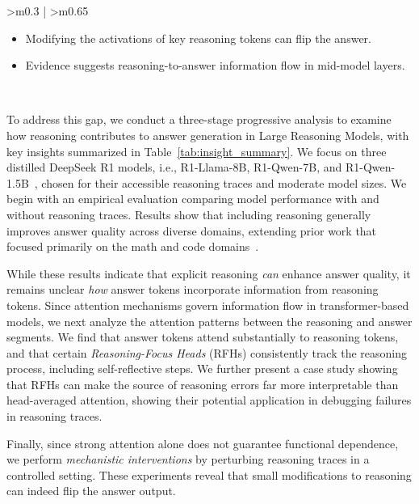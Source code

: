 \documentclass[11pt]{article}
\begin{document}
\begin{table}[ht]
\begin{tabular}{>{\centering\arraybackslash}m{0.3\textwidth} | >{\centering\arraybackslash}m{0.65\textwidth}}
    \begin{minipage}[c]{\linewidth}
      \begin{itemize}[leftmargin=*, itemsep=0pt, topsep=0pt, parsep=0pt, partopsep=0pt]
        \item Modifying the activations of key reasoning tokens can flip the answer.
        \item Evidence suggests reasoning-to-answer information flow in mid-model layers.
      \end{itemize}
    \end{minipage} \\
    \bottomrule
  \end{tabular}
  \caption{Summary of findings across empirical studies, attention analysis, and mechanistic interventions.}
  \label{tab:insight_summary}
\end{table}

To address this gap, we conduct a three-stage progressive analysis to examine how reasoning contributes to answer generation in Large Reasoning Models, with key insights summarized in Table~\ref{tab:insight_summary}. We focus on three distilled DeepSeek R1 models, i.e., R1-Llama-8B, R1-Qwen-7B, and R1-Qwen-1.5B~\cite{deepseekai2025deepseekr1incentivizingreasoningcapability}, chosen for their accessible reasoning traces and moderate model sizes. We begin with an empirical evaluation comparing model performance with and without reasoning traces. Results show that including reasoning generally improves answer quality across diverse domains, extending prior work that focused primarily on the math and code domains~\cite{ma2025reasoningmodelseffectivethinking}.

While these results indicate that explicit reasoning \textit{can} enhance answer quality, it remains unclear \textit{how} answer tokens incorporate information from reasoning tokens. Since attention mechanisms govern information flow in transformer-based models, we next analyze the attention patterns between the reasoning and answer segments. We find that answer tokens attend substantially to reasoning tokens, and that certain \emph{Reasoning-Focus Heads} (RFHs) consistently track the reasoning process, including self-reflective steps. We further present a case study showing that RFHs can make the source of reasoning errors far more interpretable than head-averaged attention, showing their potential application in debugging failures in reasoning traces.

Finally, since strong attention alone does not guarantee functional dependence, we perform \textit{mechanistic interventions} by perturbing reasoning traces in a controlled setting. These experiments reveal that small modifications to reasoning can indeed flip the answer output.
\end{document}

